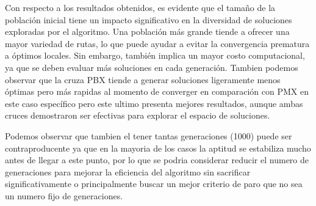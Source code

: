 Con respecto a los resultados obtenidos, es evidente que el tamaño de la población inicial tiene un impacto significativo en la diversidad de soluciones exploradas por el algoritmo.
Una población más grande tiende a ofrecer una mayor variedad de rutas, lo que puede ayudar a evitar la convergencia prematura a óptimos locales. Sin embargo, también implica un 
mayor costo computacional, ya que se deben evaluar más soluciones en cada generación. Tambien podemos observar que la cruza PBX tiende a generar soluciones ligeramente menos óptimas 
pero más rapidas al momento de converger en comparación con PMX en este caso específico pero este ultimo presenta mejores resultados, aunque ambas cruces demostraron ser efectivas 
para explorar el espacio de soluciones.

Podemos observar que tambien el tener tantas generaciones (1000) puede ser contraproducente ya que en la mayoria de los casos la aptitud se estabiliza mucho antes de llegar a este 
punto, por lo que se podria considerar reducir el numero de generaciones para mejorar la eficiencia del algoritmo sin sacrificar significativamente o principalmente buscar un mejor
criterio de paro que no sea un numero fijo de generaciones.